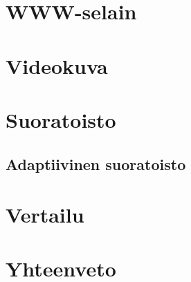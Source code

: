 \documentclass[finnish, 12pt, a4paper, elec, utf8, a-1b, online]{aaltothesis}
\begin{document}
\clearpage



\section{WWW-selain}


\clearpage


\section{Videokuva}


\clearpage


\section{Suoratoisto}


\subsection*{Adaptiivinen suoratoisto}


\clearpage


\section{Vertailu}


\clearpage


\section{Yhteenveto}


\clearpage
\end{document}
